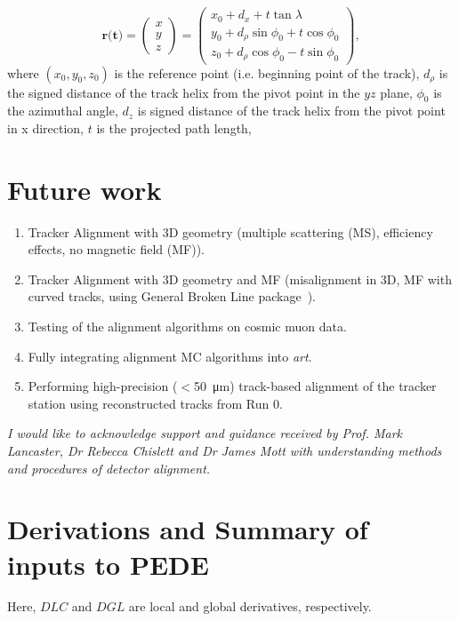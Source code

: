 \documentclass[a4paper,11pt]{article}
\def\art{{\it art}}
\begin{document}
\begin{equation}
\textbf{r(t)} = \begin{pmatrix} x \\ y \\ z \end{pmatrix} = \begin{pmatrix} x_0 + d_x + t\tan\lambda \  \\ y_0 + d_\rho\sin\phi_0 + t\cos\phi_0 \\ z_0 + d_\rho \cos\phi_0 - t \sin\phi_0 \end{pmatrix},
\end{equation}
where $(x_0, y_0, z_0)$ is the reference point (i.e. beginning point of the track), $d_\rho$ is the signed distance of the track helix from the pivot point in the $yz$ plane, $\phi_0$ is the azimuthal angle, $d_z$ is signed distance of the track helix from the pivot point in x direction, $t$ is the projected path length, 




\section{Future work}\label{sec:future}
\vspace{-0.2cm}
\vspace{-0.2cm}
\begin{enumerate}
	\setlength\itemsep{-0.5em}
	\item Tracker Alignment with 3D geometry (multiple scattering (MS), efficiency effects, no magnetic field (MF)).
	\item Tracker Alignment with 3D geometry and MF (misalignment in 3D, MF with curved tracks, using General Broken Line package~\cite{GBL}).
	\item Testing of the alignment algorithms on cosmic muon data.
	\item Fully integrating alignment MC algorithms into \art.
	\item Performing high-precision ($<$\SI{50}{\micro\metre}) track-based alignment of the tracker station using reconstructed tracks from Run 0.
\end{enumerate}
\vspace{-0.2cm}
\textit{I would like to acknowledge support and guidance received by Prof. Mark Lancaster, Dr Rebecca Chislett and Dr James Mott with understanding methods and procedures of detector alignment.}
\clearpage


\section{Derivations and Summary of inputs to PEDE} \label{sec:deriv}
Here, $DLC$ and $DGL$ are local and global derivatives, respectively. 
\end{document}
